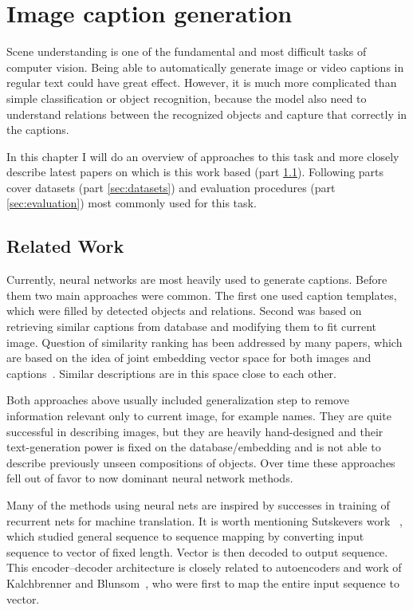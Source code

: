 \chapter{Image caption generation}\label{chp:captions}

Scene understanding is one of the fundamental and most difficult tasks of computer vision. Being able to automatically generate image or video captions in regular text could have great effect. However, it is much more complicated than simple classification or object recognition, because the model also need to understand relations between the recognized objects and capture that correctly in the captions.

In this chapter I will do an overview of approaches to this task and more closely describe latest papers on which is this work based (part \ref{sec:related}). Following parts cover datasets (part \ref{sec:datasets}) and evaluation procedures (part \ref{sec:evaluation}) most commonly used for this task.

	\section{Related Work}
	\label{sec:related}

Currently, neural networks are most heavily used to generate captions. Before them two main approaches were common. The first one used caption templates, which were filled by detected objects and relations. Second was based on retrieving similar captions from database and modifying them to fit current image. Question of similarity ranking has been addressed by many papers, which are based on the idea of joint embedding vector space for both images and captions~\cite{DBLP:journals/corr/KarpathyF14}. Similar descriptions are in this space close to each other.

Both approaches above usually included generalization step to remove information relevant only to current image, for example names. They are quite successful in describing images, but they are heavily hand-designed and their text-generation power is fixed on the database/embedding and is not able to describe previously unseen compositions of objects. Over time these approaches fell out of favor to now dominant neural network methods.

Many of the methods using neural nets are inspired by successes in training of recurrent nets for machine translation. It is worth mentioning Sutskevers work ~\cite{DBLP:journals/corr/SutskeverVL14}, which studied general sequence to sequence mapping by converting input sequence to vector of fixed length. Vector is then decoded to output sequence. This encoder--decoder architecture is closely related to autoencoders and work of Kalchbrenner and Blunsom~\cite{conf/emnlp/KalchbrennerB13}, who were first to map the entire input sequence to vector.

